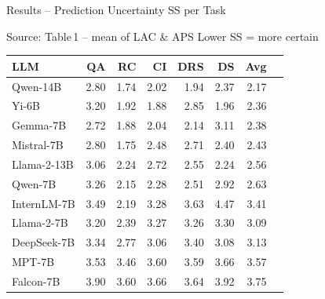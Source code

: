 \documentclass{beamer}
\newcommand{\hrow}{\rowcolor{hlblue}}
\begin{document}
\begin{frame}{Results -- Prediction Uncertainty SS per Task}

\begin{block}{\scriptsize Source: Table\,1 -- mean of LAC \& APS \quad Lower SS = more certain}
\scriptsize
\renewcommand{\arraystretch}{1.12}
\begin{center}
\begin{tabular}{lrrrrrrr}
\toprule
\textbf{LLM} & \textbf{QA} & \textbf{RC} & \textbf{CI} & \textbf{DRS} & \textbf{DS} & \textbf{Avg} \\
\midrule
\hrow Qwen-14B   & 2.80 & 1.74 & 2.02 & 1.94 & 2.37 & 2.17 \\
Yi-6B            & 3.20 & 1.92 & 1.88 & 2.85 & 1.96 & 2.36 \\
Gemma-7B         & 2.72 & 1.88 & 2.04 & 2.14 & 3.11 & 2.38 \\
Mistral-7B       & 2.80 & 1.75 & 2.48 & 2.71 & 2.40 & 2.43 \\
Llama-2-13B      & 3.06 & 2.24 & 2.72 & 2.55 & 2.24 & 2.56 \\
Qwen-7B          & 3.26 & 2.15 & 2.28 & 2.51 & 2.92 & 2.63 \\
InternLM-7B      & 3.49 & 2.19 & 3.28 & 3.63 & 4.47 & 3.41 \\
Llama-2-7B       & 3.20 & 2.39 & 3.27 & 3.26 & 3.30 & 3.09 \\
DeepSeek-7B      & 3.34 & 2.77 & 3.06 & 3.40 & 3.08 & 3.13 \\
MPT-7B           & 3.53 & 3.46 & 3.60 & 3.59 & 3.66 & 3.57 \\
Falcon-7B        & 3.90 & 3.60 & 3.66 & 3.64 & 3.92 & 3.75 \\
\bottomrule
\end{tabular}
\end{center}
\end{block}

\end{frame}
\end{document}
